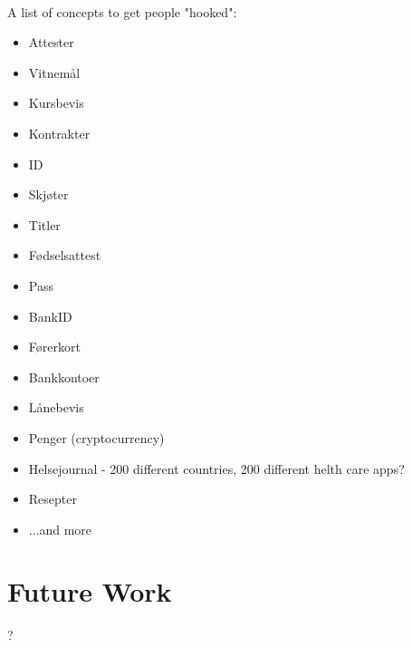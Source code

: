 \paragraph{}
A list of concepts to get people "hooked":
\begin{itemize}
    \item Attester
    \item Vitnemål
    \item Kursbevis
    \item Kontrakter
    \item ID
    \item Skjøter
    \item Titler
    \item Fødselsattest
    \item Pass
    \item BankID
    \item Førerkort
    \item Bankkontoer
    \item Lånebevis
    \item Penger (cryptocurrency)
    \item Helsejournal - 200 different countries, 200 different helth care apps?
    \item Resepter
    \item ...and more
\end{itemize}


\section{Future Work}

?